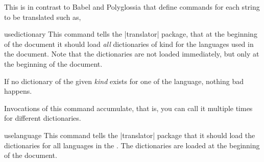 \begin{teXXX}

\end{teXXX} 

This is in contrast to Babel and Polyglossia that define
commands for each string to be translated such as,

\begin{phdverbatim}
\def\captionsdutch{%
    \def\prefacename{Voorwoord}%
    \def\refname{Referenties}%
    \def\abstractname{Samenvatting}%
    \def\bibname{Bibliografie}%
    \def\chaptername{Hoofdstuk}%
    \def\appendixname{Bijlage}%
    ...
    \def\proofname{Bewijs}%
    \def\glossaryname{Verklarende woordenlijst}%
    \def\today{\number\day~\ifcase\month%
      \or januari\or februari\or maart\or april\or mei\or juni\or
      juli\or augustus\or september\or oktober\or november\or
      december\fi
      \space \number\year}}
\end{phdverbatim}

\begin{docCommand}{usedictionary}{}
  This command tells the |translator| package, that at the beginning of
  the document it should load \textit{all} dictionaries of kind  for
  the languages used in the document. Note that the dictionaries are
  not loaded immediately, but only at the beginning of the document.

  If no dictionary of the given \emph{kind} exists for one of the
  language, nothing bad happens.

  Invocations of this command accumulate, that is, you can call it
  multiple times for different dictionaries.
\end{docCommand}

\begin{docCommand}{uselanguage}{}
  This command tells the |translator| package that it should load the
  dictionaries for all languages in the . The
  dictionaries are loaded at the beginning of the document.
\end{docCommand}



